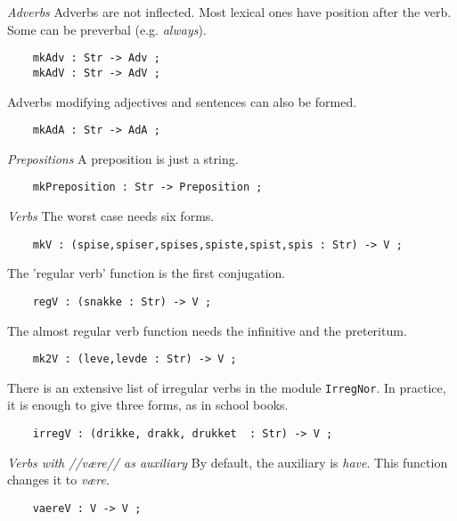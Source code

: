 \documentclass[11pt,a4paper]{article}
\newcommand{\subsubsubsection}[1]{\textit{#1}}
\begin{document}
\subsubsubsection{Adverbs}
Adverbs are not inflected. Most lexical ones have position
after the verb. Some can be preverbal (e.g. \textit{always}).

\begin{verbatim}
    mkAdv : Str -> Adv ;
    mkAdV : Str -> AdV ;
\end{verbatim}

Adverbs modifying adjectives and sentences can also be formed.

\begin{verbatim}
    mkAdA : Str -> AdA ;
\end{verbatim}

\subsubsubsection{Prepositions}
A preposition is just a string.

\begin{verbatim}
    mkPreposition : Str -> Preposition ;
\end{verbatim}

\subsubsubsection{Verbs}
The worst case needs six forms.

\begin{verbatim}
    mkV : (spise,spiser,spises,spiste,spist,spis : Str) -> V ;
\end{verbatim}

The 'regular verb' function is the first conjugation.

\begin{verbatim}
    regV : (snakke : Str) -> V ;
\end{verbatim}

The almost regular verb function needs the infinitive and the preteritum.

\begin{verbatim}
    mk2V : (leve,levde : Str) -> V ;
\end{verbatim}

There is an extensive list of irregular verbs in the module \texttt{IrregNor}.
In practice, it is enough to give three forms, as in school books.

\begin{verbatim}
    irregV : (drikke, drakk, drukket  : Str) -> V ;
\end{verbatim}

\subsubsubsection{Verbs with //være// as auxiliary}
By default, the auxiliary is \textit{have}. This function changes it to \textit{være}.

\begin{verbatim}
    vaereV : V -> V ;
\end{verbatim}
\end{document}
